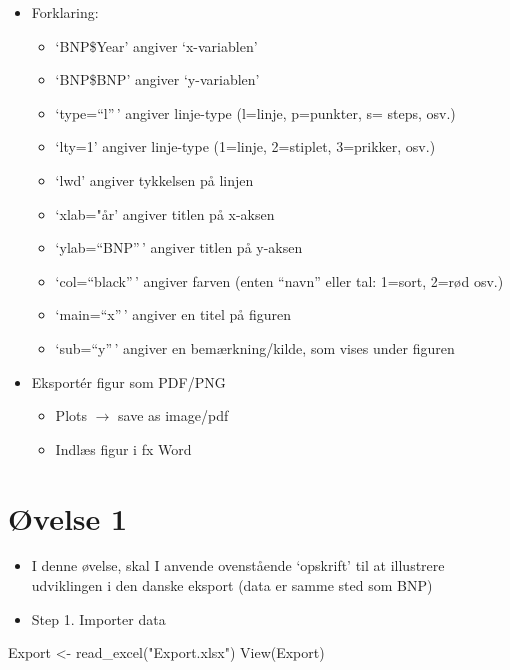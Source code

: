 \documentclass[
  12pt,
]{article}
\newenvironment{Shaded}{\begin{snugshade}}{\end{snugshade}}
\newcommand{\FunctionTok}[1]{\textcolor[rgb]{0.00,0.00,0.00}{#1}}
\newcommand{\NormalTok}[1]{#1}
\newcommand{\OtherTok}[1]{\textcolor[rgb]{0.56,0.35,0.01}{#1}}
\newcommand{\StringTok}[1]{\textcolor[rgb]{0.31,0.60,0.02}{#1}}
\providecommand{\tightlist}{%
  \setlength{\itemsep}{0pt}\setlength{\parskip}{0pt}}
\begin{document}
\begin{itemize}
\tightlist
\item
  Forklaring:

  \begin{itemize}
  \tightlist
  \item
    `BNP\$Year' angiver `x-variablen'
  \item
    `BNP\$BNP' angiver `y-variablen'
  \item
    `type=``l''\,' angiver linje-type (l=linje, p=punkter, s= steps,
    osv.)
  \item
    `lty=1' angiver linje-type (1=linje, 2=stiplet, 3=prikker, osv.)
  \item
    `lwd' angiver tykkelsen på linjen
  \item
    `xlab="år' angiver titlen på x-aksen
  \item
    `ylab=``BNP''\,' angiver titlen på y-aksen
  \item
    `col=``black''\,' angiver farven (enten ``navn'' eller tal: 1=sort,
    2=rød osv.)
  \item
    `main=``x''\,' angiver en titel på figuren
  \item
    `sub=``y''\,' angiver en bemærkning/kilde, som vises under figuren
  \end{itemize}
\item
  Eksportér figur som PDF/PNG

  \begin{itemize}
  \tightlist
  \item
    Plots \(\rightarrow\) save as image/pdf
  \item
    Indlæs figur i fx Word
  \end{itemize}
\end{itemize}

\hypertarget{uxf8velse-1}{%
\section{Øvelse 1}\label{uxf8velse-1}}

\begin{itemize}
\item
  I denne øvelse, skal I anvende ovenstående `opskrift' til at
  illustrere udviklingen i den danske eksport (data er samme sted som
  BNP)
\item
  Step 1. Importer data
\end{itemize}

\begin{Shaded}
\begin{Highlighting}[]
\NormalTok{Export }\OtherTok{\textless{}{-}} \FunctionTok{read\_excel}\NormalTok{(}\StringTok{"Export.xlsx"}\NormalTok{)}
\FunctionTok{View}\NormalTok{(Export)}
\end{Highlighting}
\end{Shaded}
\end{document}

